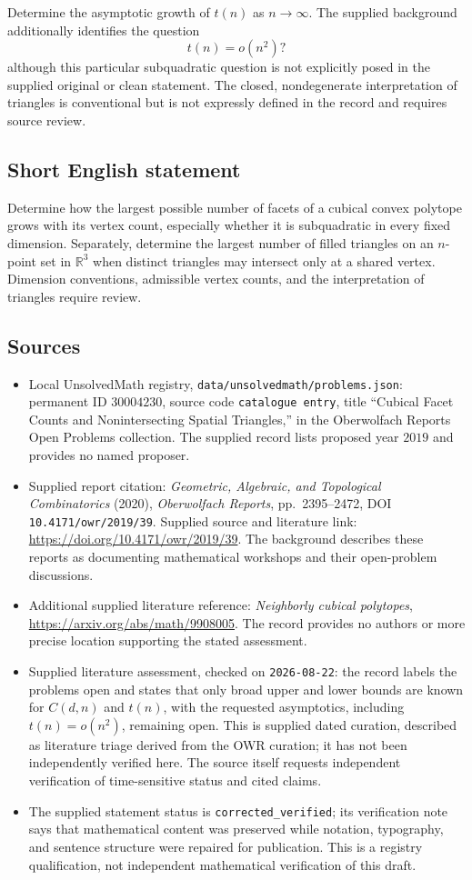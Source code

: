 \documentclass[11pt]{article}
\newcommand{\R}{\mathbb{R}}
\begin{document}
Determine the asymptotic growth of \(t(n)\) as \(n\to\infty\). The supplied background additionally identifies the question
\[
 t(n)=o(n^2)?
\]
although this particular subquadratic question is not explicitly posed in the supplied original or clean statement. The closed, nondegenerate interpretation of triangles is conventional but is not expressly defined in the record and requires source review.
\subsection{Short English statement}
Determine how the largest possible number of facets of a cubical convex polytope grows with its vertex count, especially whether it is subquadratic in every fixed dimension. Separately, determine the largest number of filled triangles on an \(n\)-point set in \(\R^3\) when distinct triangles may intersect only at a shared vertex. Dimension conventions, admissible vertex counts, and the interpretation of triangles require review.
\subsection{Sources}
\begin{itemize}
\item Local UnsolvedMath registry, \texttt{data/unsolvedmath/problems.json}: permanent ID \(30004230\), source code \texttt{catalogue entry}, title ``Cubical Facet Counts and Nonintersecting Spatial Triangles,'' in the Oberwolfach Reports Open Problems collection. The supplied record lists proposed year \(2019\) and provides no named proposer.
\item Supplied report citation: \emph{Geometric, Algebraic, and Topological Combinatorics} (2020), \emph{Oberwolfach Reports}, pp.\ 2395--2472, DOI \texttt{10.4171/owr/2019/39}. Supplied source and literature link: \url{https://doi.org/10.4171/owr/2019/39}. The background describes these reports as documenting mathematical workshops and their open-problem discussions.
\item Additional supplied literature reference: \emph{Neighborly cubical polytopes}, \url{https://arxiv.org/abs/math/9908005}. The record provides no authors or more precise location supporting the stated assessment.
\item Supplied literature assessment, checked on \texttt{2026-08-22}: the record labels the problems open and states that only broad upper and lower bounds are known for \(C(d,n)\) and \(t(n)\), with the requested asymptotics, including \(t(n)=o(n^2)\), remaining open. This is supplied dated curation, described as literature triage derived from the OWR curation; it has not been independently verified here. The source itself requests independent verification of time-sensitive status and cited claims.
\item The supplied statement status is \texttt{corrected\_verified}; its verification note says that mathematical content was preserved while notation, typography, and sentence structure were repaired for publication. This is a registry qualification, not independent mathematical verification of this draft.
\end{itemize}
\end{document}
